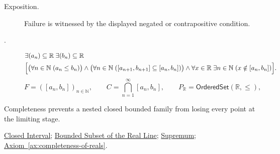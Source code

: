 \begin{remark*}
\begin{description}
  \item[Exposition.]
  Failure is witnessed by the displayed negated or contrapositive condition.

  \item[.]
  \[
\begin{aligned}
&\exists (a_n)\subseteq\mathbb{R}\;\exists (b_n)\subseteq\mathbb{R}\;\\
&\Bigl[
\bigl(\forall n\in\mathbb{N}\;(a_n\le b_n)\bigr)
\land
\bigl(\forall n\in\mathbb{N}\;([a_{n+1},b_{n+1}]\subseteq [a_n,b_n])\bigr)
\land
\forall x\in\mathbb{R}\;\exists n\in\mathbb{N}\;(x\notin [a_n,b_n])
\Bigr].
\end{aligned}
\]
\[
F=([a_n,b_n])_{n\in\mathbb{N}},\qquad C=\bigcap_{n=1}^{\infty}[a_n,b_n],\qquad
P_{\mathbb{R}}=\mathsf{OrderedSet}(\mathbb{R},\leq),
\]
\end{description}
\end{remark*}

\begin{remark*}[Interpretation]
Completeness prevents a nested closed bounded family from losing every point
at the limiting stage.
\end{remark*}

\begin{dependencies}
\hyperref[def:closed-interval]{Closed Interval};
\hyperref[def:bounded-subset-of-r]{Bounded Subset of the Real Line};
\hyperref[def:supremum]{Supremum};
\hyperref[ax:completeness-of-reals]{Axiom~\ref*{ax:completeness-of-reals}}.
\end{dependencies}

